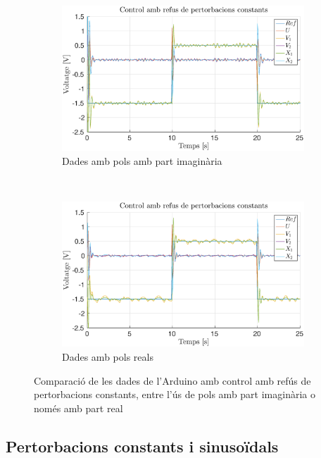 \documentclass[12pt,a4paper,final,twoside,openright]{report}
\begin{document}
\begin{figure}[h]
\centering
	\begin{subfigure}[r]{0.8\textwidth}
		\includegraphics[width=\textwidth]{Imatges/pert_ct_all_pols_imag.eps}
		\caption{Dades amb pols amb part imaginària}
	\end{subfigure}\\
	\vspace{15pt}
	\begin{subfigure}[r]{0.8\textwidth}
		\includegraphics[width=\textwidth]{Imatges/pert_ct_all_pols_real.eps}
		\caption{Dades amb pols reals}
	\end{subfigure}
\caption{Comparació de les dades de l'Arduino amb control amb refús de pertorbacions constants, entre l'ús de pols amb part imaginària o només amb part real\label{fig:pert_real_imag_ct_all}}
\end{figure}

\subsection{Pertorbacions constants i sinusoïdals}
\end{document}
